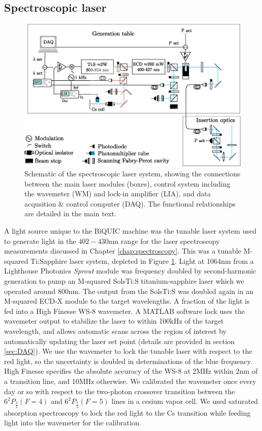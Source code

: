 	
	

\subsection*{Spectroscopic laser}
\label{sec:spec_laser}
	\begin{figure}
		\centering
		\includegraphics[width=\textwidth]{fig/apparatus/solstis_schematic_minim}
		\caption{Schematic of the spectroscopic laser system, showing the connections between the main laser modules (boxes), control system including the wavemeter (WM) and lock-in amplifier (LIA), and data acqusition \& control computer (DAQ). The functional relationships are detailed in the main text.}
		\label{fig:tunable_laser}
	\end{figure}

	A light source unique to the BiQUIC machine was the tunable laser system used to generate light in the $402-430$nm range for the laser spectroscopy measurements discussed  in Chapter \ref{chap:spectroscopy}.
	This  was a tunable M-squared Ti:Sapphire laser system, depicted in Figure \ref{fig:tunable_laser}.
	Light at 1064nm from a Lighthouse Photonics \emph{Sprout} module was frequency doubled by second-harmonic generation to pump an M-squared SolsTi:S titanium-sapphire laser which we operated around 800nm.
	The output from the SolsTi:S was doubled again in an M-squared ECD-X module to the target wavelengths.
	A fraction of the light is fed into a High Finesse WS-8 wavemeter.
	A MATLAB software lock uses the wavemeter output to stabilize the laser to within 100kHz of the target wavelength, and allows automatic scans across the region of interest by automatically updating the laser set point (details are provided in section \ref{sec:DAQ}).
	We use the wavemeter to lock the tunable laser with respect to the red light, so the uncertainty is doubled in determinations of the blue frequency.
	High Finesse specifies the absolute accuracy of the WS-8 at 2MHz within 2nm of a transition line, and 10MHz otherwise.
	We calibrated the wavemeter once every day or so with respect to the two-photon crossover transition between the $6^2P_{\frac{3}{2}} (F=4)$ and $6^2P_{\frac{3}{2}} (F=5)$ lines in a cesium vapor cell.
	We used saturated absorption spectroscopy to lock the red light to the Cs transition while feeding light into the wavemeter for the calibration.	
	


